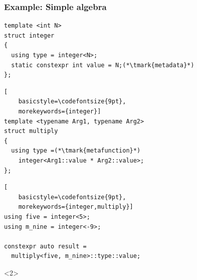 \documentclass[14pt]{beamer}
\begin{document}
\begin{frame}[fragile]
  \frametitle{Example: Simple algebra}

  \begin{lstlisting}[basicstyle=\codefontsize{9pt}]
template <int N>
struct integer
{
  using type = integer<N>;
  static constexpr int value = N;(*\tmark{metadata}*)
};
  \end{lstlisting}

  \begin{lstlisting}[
    basicstyle=\codefontsize{9pt},
    morekeywords={integer}]
template <typename Arg1, typename Arg2>
struct multiply
{
  using type =(*\tmark{metafunction}*)
    integer<Arg1::value * Arg2::value>;
};
  \end{lstlisting}

  \begin{lstlisting}[
    basicstyle=\codefontsize{9pt},
    morekeywords={integer,multiply}]
using five = integer<5>;
using m_nine = integer<-9>;

constexpr auto result = 
  multiply<five, m_nine>::type::value;
  \end{lstlisting}

  \begin{onlyenv}<2>
    \nointerlineskip
  \end{onlyenv}

\end{frame}
\end{document}
